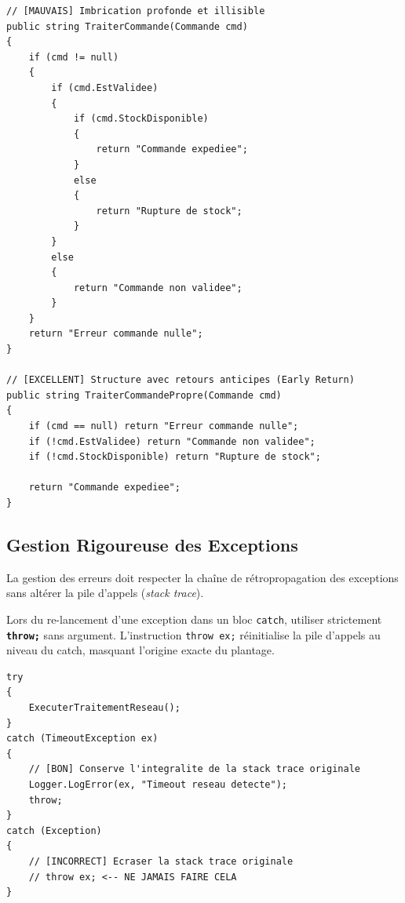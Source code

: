 \begin{lstlisting}[caption={Réfractorisation d'une méthode complexe par Early Return}]
// [MAUVAIS] Imbrication profonde et illisible
public string TraiterCommande(Commande cmd)
{
    if (cmd != null)
    {
        if (cmd.EstValidee)
        {
            if (cmd.StockDisponible)
            {
                return "Commande expediee";
            }
            else
            {
                return "Rupture de stock";
            }
        }
        else
        {
            return "Commande non validee";
        }
    }
    return "Erreur commande nulle";
}

// [EXCELLENT] Structure avec retours anticipes (Early Return)
public string TraiterCommandePropre(Commande cmd)
{
    if (cmd == null) return "Erreur commande nulle";
    if (!cmd.EstValidee) return "Commande non validee";
    if (!cmd.StockDisponible) return "Rupture de stock";

    return "Commande expediee";
}
\end{lstlisting}



\subsection{Gestion Rigoureuse des Exceptions}

La gestion des erreurs doit respecter la chaîne de rétropropagation des exceptions sans altérer la pile d'appels (\emph{stack trace}).

\begin{tcolorbox}[colback=backcolour,colframe=codegray,title=\textbf{Règle d'or : \texttt{throw;} vs \texttt{throw ex;}}]
    Lors du re-lancement d'une exception dans un bloc \texttt{catch}, utiliser strictement \textbf{\texttt{throw;}} sans argument. L'instruction \texttt{throw ex;} réinitialise la pile d'appels au niveau du catch, masquant l'origine exacte du plantage.
\end{tcolorbox}

\begin{lstlisting}[caption={Bonnes pratiques de re-lancement d'exceptions}]
try
{
    ExecuterTraitementReseau();
}
catch (TimeoutException ex)
{
    // [BON] Conserve l'integralite de la stack trace originale
    Logger.LogError(ex, "Timeout reseau detecte");
    throw; 
}
catch (Exception)
{
    // [INCORRECT] Ecraser la stack trace originale
    // throw ex; <-- NE JAMAIS FAIRE CELA
}
\end{lstlisting}



